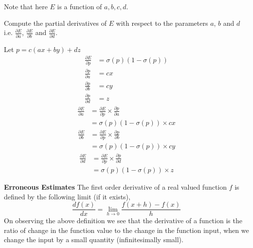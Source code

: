 \documentclass[solution,addpoints,12pt]{exam}
\begin{document}
\begin{questions}
\begin{parts}
                  Note that here $E$ is a function of $a,b,c,d$.


                  Compute the partial derivatives of $E$ with respect to the parameters $a$, $b$ and $d$ i.e. $\frac{\partial E}{\partial a}$, $\frac{\partial E}{\partial b}$ and $\frac{\partial E}{\partial d}$.
             
              
              \begin{solution}
					Let $p = c(ax+by) + dz$              	
              	\begin{align*}
              		\frac{\partial E}{\partial p} &= \sigma (p)(1 - \sigma (p))\\
              		\frac{\partial p}{\partial a} &= cx\\
              		\frac{\partial p}{\partial b} &= cy\\
              		\frac{\partial p}{\partial d} &= z
              	\end{align*}
              	\begin{align*}
              		\frac{\partial E}{\partial a} &= \frac{\partial E}{\partial p} \times \frac{\partial p}{\partial a}\\
              										&= \sigma (p)(1 - \sigma (p)) \times cx
              	\end{align*}
              	\begin{align*}
              		\frac{\partial E}{\partial b} &= \frac{\partial E}{\partial p} \times \frac{\partial p}{\partial b}\\
              										&= \sigma (p)(1 - \sigma (p)) \times cy
              	\end{align*}
              	\begin{align*}
              		\frac{\partial E}{\partial d} &= \frac{\partial E}{\partial p} \times \frac{\partial p}{\partial d}\\
              										&= \sigma (p)(1 - \sigma (p)) \times z
              	\end{align*}
              \end{solution}


          \end{parts}        

\question \textbf{Erroneous Estimates}
\newline
The first order derivative of a real valued function $f$ is defined by the following limit (if it exists),
          \begin{equation} \label{eq:deriv_definition}
            \frac{df(x)}{dx} = \lim_{h \to 0} \frac{f(x + h) - f(x)}{h}
          \end{equation}
          On observing the above definition we see that the derivative of a function is the ratio of
          change in the function value to the change in the function input, 
          when we change the input by a small quantity (infinitesimally small).


\end{questions}
\end{document}
